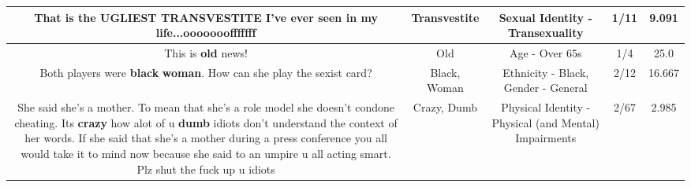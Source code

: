 \documentclass[11pt]{article}
\newlength\mylength
\begin{document}
\begin{center}
\begin{longtable}{|C{.65\mylength}|C{.30\mylength}|C{.12\mylength}|C{.12\mylength}|C{.12\mylength}|}
  \small That is the UGLIEST \textbf{TRANSVESTITE} I've ever seen in my life...ooooooofffffff\normalsize   & Transvestite & Sexual Identity - Transexuality & 1/11 & 9.091 \\  \hline
  \small This is \textbf{old} news!\normalsize   & Old & Age - Over 65s & 1/4 & 25.0 \\  \hline
  \small Both players were \textbf{black} \textbf{woman}. How can she play the sexist card?\normalsize   & Black, Woman & Ethnicity - Black, Gender - General & 2/12 & 16.667 \\  \hline
  \small She said she's a mother. To mean that she's a role model she doesn't condone cheating. Its \textbf{crazy} how alot of u \textbf{dumb} idiots don't understand the context of her words. If she said that she's a mother during a press conference you all would take it to mind now because she said to an umpire u all acting smart. Plz shut the fuck up u idiots\normalsize   & Crazy, Dumb & Physical Identity - Physical (and Mental) Impairments & 2/67 & 2.985 \\  \hline

\end{longtable}
\end{center}
\end{document}
